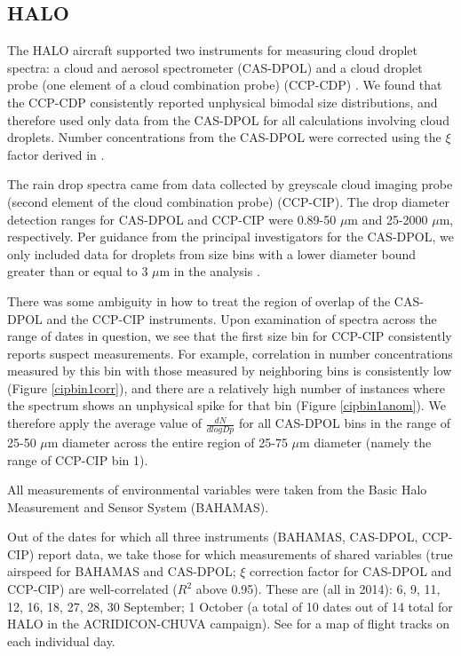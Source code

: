 \documentclass{article}
\begin{document}
\subsection{HALO}

The HALO aircraft supported two instruments for measuring cloud droplet spectra: a cloud and aerosol spectrometer (CAS-DPOL) and a cloud droplet probe (one element of a cloud combination probe) (CCP-CDP) \cite{Braga2017}. We found that the CCP-CDP consistently reported unphysical bimodal size distributions, and therefore used only data from the CAS-DPOL for all calculations involving cloud droplets. Number concentrations from the CAS-DPOL were corrected using the $\xi$ factor derived in \cite{Weigel2016}.

The rain drop spectra came from data collected by greyscale cloud imaging probe (second element of the cloud combination probe) (CCP-CIP). The drop diameter detection ranges for CAS-DPOL and CCP-CIP were 0.89-50 $\mu$m and 25-2000 $\mu$m, respectively. Per guidance from the principal investigators for the CAS-DPOL, we only included data for droplets from size bins with a lower diameter bound greater than or equal to 3 $\mu$m in the analysis \cite{Jurkat2020}.  

There was some ambiguity in how to treat the region of overlap of the CAS-DPOL and the CCP-CIP instruments. Upon examination of spectra across the range of dates in question, we see that the first size bin for CCP-CIP consistently reports suspect measurements. For example, correlation in number concentrations measured by this bin with those measured by neighboring bins is consistently low (Figure \ref{cipbin1corr}), and there are a relatively high number of instances where the spectrum shows an unphysical spike for that bin (Figure \ref{cipbin1anom}). We therefore apply the average value of $\frac{dN}{dlogDp}$ for all CAS-DPOL bins in the range of 25-50 $\mu$m diameter across the entire region of 25-75 $\mu$m diameter (namely the range of CCP-CIP bin 1). 

All measurements of environmental variables were taken from the Basic Halo Measurement and Sensor System (BAHAMAS).

Out of the dates for which all three instruments (BAHAMAS, CAS-DPOL, CCP-CIP) report data, we take those for which measurements of shared variables (true airspeed for BAHAMAS and CAS-DPOL; $\xi$ correction factor for CAS-DPOL and CCP-CIP) are well-correlated ($R^2$ above 0.95). These are (all in 2014): 6, 9, 11, 12, 16, 18, 27, 28, 30 September; 1 October (a total of 10 dates out of 14 total for HALO in the ACRIDICON-CHUVA campaign). See \cite{Wendisch2016} for a map of flight tracks on each individual day.
\end{document}

